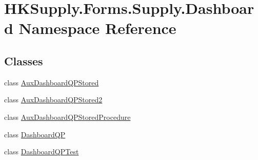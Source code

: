 \hypertarget{namespace_h_k_supply_1_1_forms_1_1_supply_1_1_dashboard}{}\section{H\+K\+Supply.\+Forms.\+Supply.\+Dashboard Namespace Reference}
\label{namespace_h_k_supply_1_1_forms_1_1_supply_1_1_dashboard}
\subsection*{Classes}
\begin{DoxyCompactItemize}
\item 
class \mbox{\hyperlink{class_h_k_supply_1_1_forms_1_1_supply_1_1_dashboard_1_1_aux_dashboard_q_p_stored}{Aux\+Dashboard\+Q\+P\+Stored}}
\item 
class \mbox{\hyperlink{class_h_k_supply_1_1_forms_1_1_supply_1_1_dashboard_1_1_aux_dashboard_q_p_stored2}{Aux\+Dashboard\+Q\+P\+Stored2}}
\item 
class \mbox{\hyperlink{class_h_k_supply_1_1_forms_1_1_supply_1_1_dashboard_1_1_aux_dashboard_q_p_stored_procedure}{Aux\+Dashboard\+Q\+P\+Stored\+Procedure}}
\item 
class \mbox{\hyperlink{class_h_k_supply_1_1_forms_1_1_supply_1_1_dashboard_1_1_dashboard_q_p}{Dashboard\+QP}}
\item 
class \mbox{\hyperlink{class_h_k_supply_1_1_forms_1_1_supply_1_1_dashboard_1_1_dashboard_q_p_test}{Dashboard\+Q\+P\+Test}}
\end{DoxyCompactItemize}
